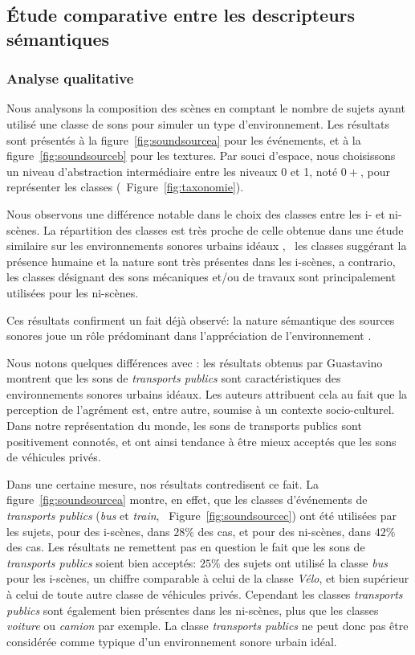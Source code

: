 \subsection{Étude comparative entre les descripteurs sémantiques}

\subsubsection{Analyse qualitative}
\label{sec:ch5_anaQualiSem}

Nous analysons la composition des scènes en comptant le nombre de sujets ayant utilisé une classe de sons pour simuler un type d'environnement. Les résultats sont présentés à la figure~\ref{fig:soundsourcea} pour les événements, et à la figure~\ref{fig:soundsourceb} pour les textures. Par souci d'espace, nous choisissons un niveau d'abstraction intermédiaire entre les niveaux 0 et 1, noté $0+$, pour représenter les classes (\cf~Figure~\ref{fig:taxonomie}).

Nous observons une différence notable dans le choix des classes entre les i- et ni-scènes. La répartition des classes est très proche de celle obtenue dans une étude similaire sur les environnements sonores urbains idéaux \citep{guastavino2006ideal}, \ie~les classes suggérant la présence humaine et la nature sont très présentes dans les i-scènes, a contrario, les classes désignant des sons mécaniques et/ou de travaux sont principalement utilisées pour les ni-scènes.

Ces résultats confirment un fait déjà observé: la nature sémantique des sources sonores joue un rôle prédominant dans l'appréciation de l'environnement \citep{raimbault2005urban,dubois2006cognitive}.

Nous notons quelques différences avec \citep{guastavino2006ideal}: les résultats obtenus par Guastavino montrent que les sons de \emph{transports publics} sont caractéristiques des environnements sonores urbains idéaux. Les auteurs attribuent cela au fait que la perception de l'agrément est, entre autre, soumise à un contexte socio-culturel. Dans notre représentation du monde, les sons de transports publics sont positivement connotés, et ont ainsi tendance à être mieux acceptés que les sons de véhicules privés.

Dans une certaine mesure, nos résultats contredisent ce fait. La figure~\ref{fig:soundsourcea} montre, en effet, que les classes d'événements de \emph{transports publics} (\emph{bus} et \emph{train}, \cf~Figure~\ref{fig:soundsourcec}) ont été utilisées par les sujets, pour des i-scènes, dans $28\%$ des cas, et pour des ni-scènes, dans $42\%$ des cas. Les résultats ne remettent pas en question le fait que les sons de \emph{transports publics} soient bien acceptés: $25\%$ des sujets ont utilisé la classe \emph{bus} pour les i-scènes, un chiffre comparable à celui de la classe \emph{Vélo}, et bien supérieur à celui de toute autre classe de véhicules privés. Cependant les classes \emph{transports publics} sont également bien présentes dans les ni-scènes, plus que les classes \emph{voiture} ou \emph{camion} par exemple. La classe \emph{transports publics} ne peut donc pas être considérée comme typique d'un environnement sonore urbain idéal.

